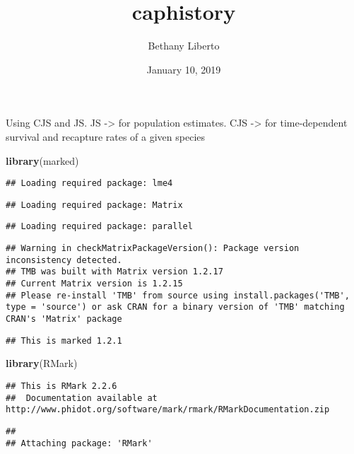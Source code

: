 \documentclass[]{article}
\title{caphistory}
\author{Bethany Liberto}
\date{January 10, 2019}
\newenvironment{Shaded}{\begin{snugshade}}{\end{snugshade}}
\newcommand{\KeywordTok}[1]{\textcolor[rgb]{0.13,0.29,0.53}{\textbf{#1}}}
\newcommand{\NormalTok}[1]{#1}
\begin{document}
\maketitle

Using CJS and JS. JS -\textgreater{} for population estimates. CJS
-\textgreater{} for time-dependent survival and recapture rates of a
given species

\begin{Shaded}
\begin{Highlighting}[]
\KeywordTok{library}\NormalTok{(marked)}
\end{Highlighting}
\end{Shaded}

\begin{verbatim}
## Loading required package: lme4
\end{verbatim}

\begin{verbatim}
## Loading required package: Matrix
\end{verbatim}

\begin{verbatim}
## Loading required package: parallel
\end{verbatim}

\begin{verbatim}
## Warning in checkMatrixPackageVersion(): Package version inconsistency detected.
## TMB was built with Matrix version 1.2.17
## Current Matrix version is 1.2.15
## Please re-install 'TMB' from source using install.packages('TMB', type = 'source') or ask CRAN for a binary version of 'TMB' matching CRAN's 'Matrix' package
\end{verbatim}

\begin{verbatim}
## This is marked 1.2.1
\end{verbatim}

\begin{Shaded}
\begin{Highlighting}[]
\KeywordTok{library}\NormalTok{(RMark)}
\end{Highlighting}
\end{Shaded}

\begin{verbatim}
## This is RMark 2.2.6
##  Documentation available at http://www.phidot.org/software/mark/rmark/RMarkDocumentation.zip
\end{verbatim}

\begin{verbatim}
## 
## Attaching package: 'RMark'
\end{verbatim}
\end{document}
